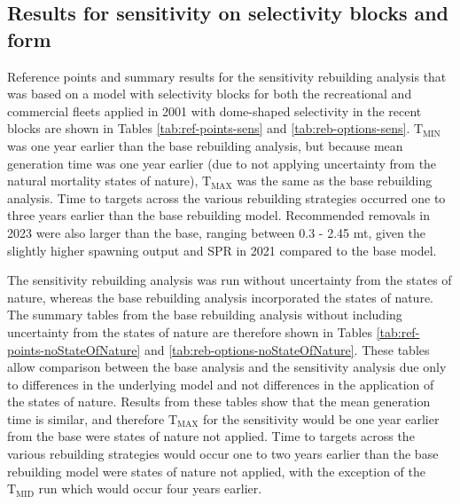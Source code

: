\documentclass[11pt,
  english,
  a4paper,
]{article}
\begin{document}

\hypertarget{results-for-sensitivity-on-selectivity-blocks-and-form}{%
\subsection{Results for sensitivity on selectivity blocks and form}\label{results-for-sensitivity-on-selectivity-blocks-and-form}}

\leavevmode\tagmcend\tagstructend


Reference points and summary results for the sensitivity rebuilding analysis that was based on a model with selectivity blocks for both the recreational and commercial fleets applied in 2001 with dome-shaped selectivity in the recent blocks are shown in Tables \ref{tab:ref-points-sens} and \ref{tab:reb-options-sens}. {\(\text{T}_\text{MIN}\)\leavevmode\tagmcend\tagstructend} was one year earlier than the base rebuilding analysis, but because mean generation time was one year earlier (due to not applying uncertainty from the natural mortality states of nature), {\(\text{T}_\text{MAX}\)\leavevmode\tagmcend\tagstructend} was the same as the base rebuilding analysis. Time to targets across the various rebuilding strategies occurred one to three years earlier than the base rebuilding model. Recommended removals in 2023 were also larger than the base, ranging between 0.3 - 2.45 mt, given the slightly higher spawning output and SPR in 2021 compared to the base model.

\leavevmode\tagmcend\tagstructend\par


The sensitivity rebuilding analysis was run without uncertainty from the states of nature, whereas the base rebuilding analysis incorporated the states of nature. The summary tables from the base rebuilding analysis without including uncertainty from the states of nature are therefore shown in Tables \ref{tab:ref-points-noStateOfNature} and \ref{tab:reb-options-noStateOfNature}. These tables allow comparison between the base analysis and the sensitivity analysis due only to differences in the underlying model and not differences in the application of the states of nature. Results from these tables show that the mean generation time is similar, and therefore {\(\text{T}_\text{MAX}\)\leavevmode\tagmcend\tagstructend} for the sensitivity would be one year earlier from the base were states of nature not applied. Time to targets across the various rebuilding strategies would occur one to two years earlier than the base rebuilding model were states of nature not applied, with the exception of the {\(\text{T}_\text{MID}\)\leavevmode\tagmcend\tagstructend} run which would occur four years earlier.
\end{document}
